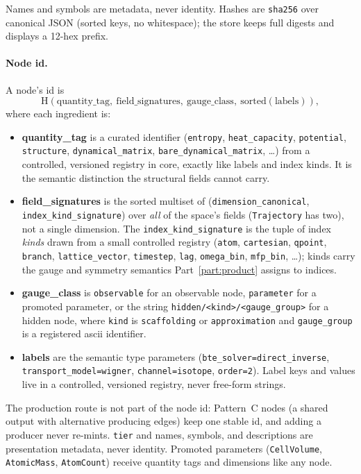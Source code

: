 \documentclass[11pt,a4paper]{article}
\begin{document}
Names and symbols are metadata, never identity. Hashes are \texttt{sha256} over
canonical JSON (sorted keys, no whitespace); the store keeps full digests and
displays a 12-hex prefix.

\paragraph{Node id.} A node's id is
\[
  \mathrm{H}(\text{quantity\_tag},\ \text{field\_signatures},\ \text{gauge\_class},\ \mathrm{sorted}(\text{labels})),
\]
where each ingredient is:
\begin{itemize}[leftmargin=2em, itemsep=0.2em]
  \item \textbf{quantity\_tag} is a curated identifier (\texttt{entropy},
        \texttt{heat\_capacity}, \texttt{potential}, \texttt{structure},
        \texttt{dynamical\_matrix}, \texttt{bare\_dynamical\_matrix}, \ldots) from
        a controlled, versioned registry in core, exactly like labels and index
        kinds. It is the semantic distinction the structural fields cannot carry.
  \item \textbf{field\_signatures} is the sorted multiset of
        (\texttt{dimension\_canonical}, \texttt{index\_kind\_signature}) over
        \emph{all} of the space's fields (\texttt{Trajectory} has two), not a
        single dimension. The \texttt{index\_kind\_signature} is the tuple of
        index \emph{kinds} drawn from a small controlled registry
        (\texttt{atom}, \texttt{cartesian}, \texttt{qpoint}, \texttt{branch},
        \texttt{lattice\_vector}, \texttt{timestep}, \texttt{lag},
        \texttt{omega\_bin}, \texttt{mfp\_bin}, \ldots); kinds carry the
        gauge and symmetry semantics Part~\ref{part:product} assigns to indices.
  \item \textbf{gauge\_class} is \texttt{observable} for an observable node,
        \texttt{parameter} for a promoted parameter, or the string
        \texttt{hidden/<kind>/<gauge\_group>} for a hidden node, where
        \texttt{kind} is \texttt{scaffolding} or \texttt{approximation} and
        \texttt{gauge\_group} is a registered ascii identifier.
  \item \textbf{labels} are the semantic type parameters
        (\texttt{bte\_solver=direct\_inverse}, \texttt{transport\_model=wigner},
        \texttt{channel=isotope}, \texttt{order=2}). Label keys and values live in
        a controlled, versioned registry, never free-form strings.
\end{itemize}
The production route is not part of the node id: Pattern~C nodes (a shared output
with alternative producing edges) keep one stable id, and adding a producer never
re-mints. \texttt{tier} and names, symbols, and descriptions are presentation
metadata, never identity. Promoted parameters (\texttt{CellVolume},
\texttt{AtomicMass}, \texttt{AtomCount}) receive quantity tags and dimensions like
any node.
\end{document}

